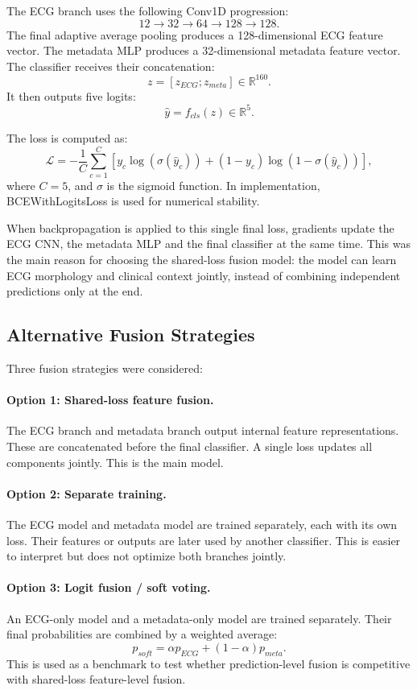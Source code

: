 \documentclass[11pt,a4paper]{article}
\begin{document}
The ECG branch uses the following Conv1D progression:
\[
    12 \rightarrow 32 \rightarrow 64 \rightarrow 128 \rightarrow 128.
\]
The final adaptive average pooling produces a 128-dimensional ECG feature vector. The metadata MLP produces a 32-dimensional metadata feature vector. The classifier receives their concatenation:
\[
    z = [z_{ECG}; z_{meta}] \in \mathbb{R}^{160}.
\]
It then outputs five logits:
\[
    \hat{y} = f_{cls}(z) \in \mathbb{R}^{5}.
\]

The loss is computed as:
\[
\mathcal{L} = - \frac{1}{C}\sum_{c=1}^{C}\left[y_c \log(\sigma(\hat{y}_c)) + (1-y_c)\log(1-\sigma(\hat{y}_c))\right],
\]
where \(C=5\), and \(\sigma\) is the sigmoid function. In implementation, BCEWithLogitsLoss is used for numerical stability.

When backpropagation is applied to this single final loss, gradients update the ECG CNN, the metadata MLP and the final classifier at the same time. This was the main reason for choosing the shared-loss fusion model: the model can learn ECG morphology and clinical context jointly, instead of combining independent predictions only at the end.

\subsection{Alternative Fusion Strategies}

Three fusion strategies were considered:

\paragraph{Option 1: Shared-loss feature fusion.}
The ECG branch and metadata branch output internal feature representations. These are concatenated before the final classifier. A single loss updates all components jointly. This is the main model.

\paragraph{Option 2: Separate training.}
The ECG model and metadata model are trained separately, each with its own loss. Their features or outputs are later used by another classifier. This is easier to interpret but does not optimize both branches jointly.

\paragraph{Option 3: Logit fusion / soft voting.}
An ECG-only model and a metadata-only model are trained separately. Their final probabilities are combined by a weighted average:
\[
    p_{soft} = \alpha p_{ECG} + (1-\alpha)p_{meta}.
\]
This is used as a benchmark to test whether prediction-level fusion is competitive with shared-loss feature-level fusion.
\end{document}
